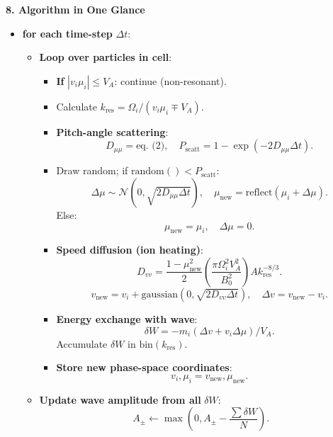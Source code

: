 \begin{tcolorbox}[colframe=black, colback=white, title=Self-Contained Monte-Carlo Recipe for Solar-Wind Ions]

\textbf{8. Algorithm in One Glance}

\begin{itemize}
    \item \textbf{for each time-step} \( \Delta t \):
    \begin{itemize}
        \item \textbf{Loop over particles in cell}:
        \begin{itemize}
            \item \textbf{If} \( |v_i \mu_i| \leq V_A \): continue (non-resonant).
            \item Calculate \( k_{\text{res}} = \Omega_i / (v_i \mu_i \mp V_A) \).
            \item \textbf{Pitch-angle scattering}:
            \[
            D_{\mu\mu} = \text{eq.~(2)}, \quad P_{\text{scatt}} = 1 - \exp(-2 D_{\mu\mu} \Delta t).
            \]
            \item Draw random; if \( \text{random}() < P_{\text{scatt}} \):
            \[
            \Delta \mu \sim \mathcal{N}(0, \sqrt{2 D_{\mu\mu} \Delta t}), \quad \mu_{\text{new}} = \text{reflect}(\mu_i + \Delta \mu).
            \]
            Else:
            \[
            \mu_{\text{new}} = \mu_i, \quad \Delta \mu = 0.
            \]
            \item \textbf{Speed diffusion (ion heating)}:
            \[
            D_{vv} = \frac{1 - \mu_{\text{new}}^2}{2} \left( \frac{\pi \Omega_i^2 V_A^2}{B_0^2} \right) A k_{\text{res}}^{-8/3}.
            \]
            \[
            v_{\text{new}} = v_i + \text{gaussian}(0, \sqrt{2 D_{vv} \Delta t}), \quad \Delta v = v_{\text{new}} - v_i.
            \]
            \item \textbf{Energy exchange with wave}:
            \[
            \delta W = -m_i ( \Delta v + v_i \Delta \mu ) / V_A.
            \]
            Accumulate \( \delta W \) in \( \text{bin}(k_{\text{res}}) \).
            \item \textbf{Store new phase-space coordinates}:
            \[
            v_i, \mu_i = v_{\text{new}}, \mu_{\text{new}}.
            \]
        \end{itemize}
        \item \textbf{Update wave amplitude from all} \( \delta W \):
        \[
        A_{\pm} \leftarrow \max\left( 0, A_{\pm} - \frac{\sum \delta W}{N} \right).
        \]
    \end{itemize}
\end{itemize}


\end{tcolorbox}
